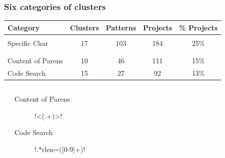 \begin{frame}[fragile]
\frametitle{Six categories of clusters}
\begin{adjustbox}{width=0.95\textwidth}
\begin{tabular}{p{1.25in}cccc}
\toprule
\textbf{Category} & \textbf{Clusters} & \textbf{Patterns} & \textbf{Projects} & \textbf{\% Projects} \\  \midrule
 \\
\midrule
Specific Char & 17 & 103 & 184 & 25\% \\
\midrule
\\
\midrule
\\
\midrule
Content of Parens & 10 & 46 & 111 & 15\% \\
\midrule
Code Search & 15 & 27 & 92 & 13\% \\
\bottomrule
\end{tabular}
\end{adjustbox}
\begin{columns}[b]
\begin{footnotesize}
\begin{description}
\item [Specific Char] \cverb!:+!, \cverb!}!, \cverb!%
\end{description}
\end{footnotesize}
\begin{footnotesize}
\begin{description}
\item [Content of Parens] \cverb!<(.+)>!%
\item [Code Search]\cverb!.*rlen=([0-9]+)!
\end{description}
\end{footnotesize}
\end{columns}
\end{frame}




%
%



